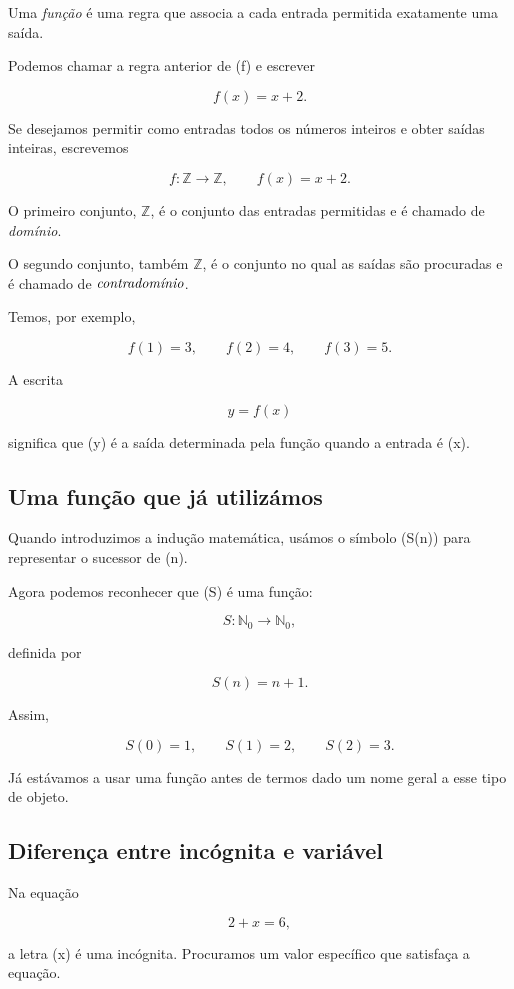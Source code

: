 \documentclass[12pt,a4paper]{article}
\begin{document}
Uma \emph{função} é uma regra que associa a cada entrada permitida
exatamente uma saída.

Podemos chamar a regra anterior de (f) e escrever

\[
f(x)=x+2.
\]

Se desejamos permitir como entradas todos os números inteiros e obter
saídas inteiras, escrevemos

\[
f\colon\mathbb{Z}\longrightarrow\mathbb{Z},
\qquad
f(x)=x+2.
\]

O primeiro conjunto, $\mathbb{Z}$, é o conjunto das entradas
permitidas e é chamado de \emph{domínio}.

O segundo conjunto, também $\mathbb{Z}$, é o conjunto no qual as
saídas são procuradas e é chamado de $\emph{contradomínio}$.

Temos, por exemplo,

\[
f(1)=3,\qquad
f(2)=4,\qquad
f(3)=5.
\]

A escrita

\[
y=f(x)
\]

significa que (y) é a saída determinada pela função quando a entrada
é (x).

\subsection{Uma função que já utilizámos}

Quando introduzimos a indução matemática, usámos o símbolo (S(n)) para
representar o sucessor de (n).

Agora podemos reconhecer que (S) é uma função:

\[
S\colon\mathbb{N}_0\longrightarrow\mathbb{N}_0,
\]

definida por

\[
S(n)=n+1.
\]

Assim,

\[
S(0)=1,\qquad
S(1)=2,\qquad
S(2)=3.
\]

Já estávamos a usar uma função antes de termos dado um nome geral a esse
tipo de objeto.

\subsection{Diferença entre incógnita e variável}

Na equação

\[
2+x=6,
\]

a letra (x) é uma incógnita. Procuramos um valor específico que
satisfaça a equação.
\end{document}
